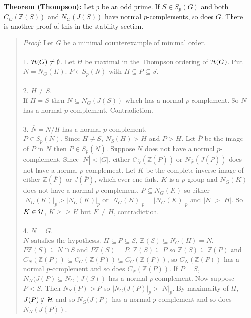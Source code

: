 {\bf Theorem (Thompson):}  Let $p$ be an odd prime.  If $S \in S_p(G)$ and both $C_G({\mathbb Z}(S))$ and 
$N_G(J(S))$ have normal $p$-complements, so does $G$.  There is another proof of this in the
stability section.
\begin{quote}
\emph{Proof:}
Let $G$ be a minimal counterexample of minimal order.
\\
\\
1. ${\cal H}(G) \neq \emptyset$. Let $H$ be maximal in the Thompson ordering of ${\cal H}(G)$.  Put $N = N_G(H)$.
$P \in S_p(N)$ with $H \subseteq P \subseteq S$.
\\
\\
2. $H \neq S$.
\\
If $H = S$ then $N \subseteq N_G(J(S))$ which has a normal $p$-complement.
So $N$ has a normal $p$-complement.
Contradiction.
\\
\\
3. ${\overline N} = N/H$ has a normal $p$-complement.
\\
$P \in S_p(N)$.  Since $H \neq S$, $N_S(H) > H$ and $P > H$.
Let ${\overline P}$ be the image of $P$ in ${\overline N}$ then ${\overline P} \in S_p({\overline N})$.
Suppose ${\overline N}$ does not have a normal $p$-complement.  Since $|{\overline N}| < |G|$, either
$C_{\overline N}({\mathbb Z}({\overline P}))$ or $N_{\overline N}(J({\overline P}))$ does not 
have a normal $p$-complement.
Let $K$ be the complete inverse image of either ${\mathbb Z}({\overline P})$ or 
$J({\overline P})$, which ever one fails.
$K$ is a $p$-group and $N_G(K)$ does not have a normal $p$-complement.
$P \subseteq N_G(K)$ so either $|N_G(K)|_p > |N_G(K)|_p$ or
$|N_G(K)|_p = |N_G(K)|_p$ and $|K| > |H|$.  So $K \in {\cal H}$, $K \geq \geq H$ but $K \neq H$, contradiction.
\\
\\
4. $N = G$.
\\
$N$ satisfies the hypothesis. $H \subseteq P \subseteq S$, 
${\mathbb Z}(S) \subseteq N_G(H) = N$. $P {\mathbb Z}(S) \subseteq N \cap S$
and $P {\mathbb Z}(S) = P$.  ${\mathbb Z}(S) \subseteq P$ so ${\mathbb Z}(S) \subseteq {\mathbb Z}(P)$ and
$C_N({\mathbb Z}(P)) \subseteq C_G({\mathbb Z}(P)) \subseteq C_G({\mathbb Z}(P))$, so $C_N({\mathbb Z}(P))$ has
a normal $p$-complement and so does $C_N({\mathbb Z}(P))$.
If $P = S$, $N_N(J(P) \subseteq N_G(J(S))$ has a normal $p$-complement.
Now suppose $P < S$.  Then $N_S(P) > P$ so $|N_G(J(P)|_p > |N|_p$.
By maximality of $H$, $J(P) \notin {\cal H}$
and so $N_G(J(P)$ has a normal $p$-complement and so does $N_N(J(P))$.

\end{quote}
